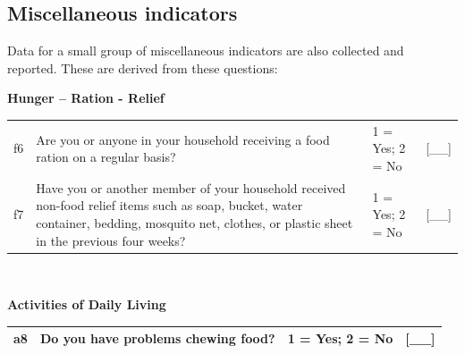 \documentclass[12pt,a4paper]{book}
\theoremstyle{definition}
\theoremstyle{definition}
\theoremstyle{definition}
\theoremstyle{remark}
\begin{document}
\hypertarget{miscellaneous-indicators}{%
\subsection{Miscellaneous indicators}\label{miscellaneous-indicators}}

Data for a small group of miscellaneous indicators are also collected
and reported. These are derived from these questions:

\textbf{Hunger -- Ration - Relief}

\begin{longtable}[]{@{}llll@{}}
\toprule
\begin{minipage}[t]{0.09\columnwidth}\raggedright
f6\strut
\end{minipage} & \begin{minipage}[t]{0.41\columnwidth}\raggedright
Are you or anyone in your household receiving a food ration on a regular
basis?\strut
\end{minipage} & \begin{minipage}[t]{0.25\columnwidth}\raggedright
1 = Yes; 2 = No\strut
\end{minipage} & \begin{minipage}[t]{0.13\columnwidth}\raggedright
{[}\_\_{]}\strut
\end{minipage}\tabularnewline
\begin{minipage}[t]{0.09\columnwidth}\raggedright
f7\strut
\end{minipage} & \begin{minipage}[t]{0.41\columnwidth}\raggedright
Have you or another member of your household received non-food relief
items such as soap, bucket, water container, bedding, mosquito net,
clothes, or plastic sheet in the previous four weeks?\strut
\end{minipage} & \begin{minipage}[t]{0.25\columnwidth}\raggedright
1 = Yes; 2 = No\strut
\end{minipage} & \begin{minipage}[t]{0.13\columnwidth}\raggedright
{[}\_\_{]}\strut
\end{minipage}\tabularnewline
\bottomrule
\end{longtable}

~

\textbf{Activities of Daily Living}

\begin{longtable}[]{@{}llll@{}}
\toprule
\begin{minipage}[t]{0.09\columnwidth}\raggedright
a8\strut
\end{minipage} & \begin{minipage}[t]{0.41\columnwidth}\raggedright
Do you have problems chewing food?\strut
\end{minipage} & \begin{minipage}[t]{0.25\columnwidth}\raggedright
1 = Yes; 2 = No\strut
\end{minipage} & \begin{minipage}[t]{0.13\columnwidth}\raggedright
{[}\_\_{]}\strut
\end{minipage}\tabularnewline
\bottomrule
\end{longtable}
\end{document}
